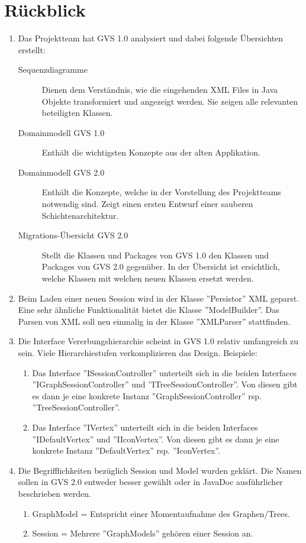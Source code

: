 \documentclass[11pt, a4paper,oneside]{scrartcl}
\begin{document}
\section{Rückblick}
\begin{enumerate}
	\item Das Projektteam hat GVS 1.0 analysiert und dabei folgende Übersichten erstellt:
	\begin{description}
		\item[Sequenzdiagramme] Dienen dem Verständnis, wie die eingehenden XML Files in Java Objekte transformiert und angezeigt werden. Sie zeigen alle relevanten beteiligten Klassen.
		\item[Domainmodell GVS 1.0 ] Enthält die wichtigsten Konzepte aus der alten Applikation.
		\item[Domainmodell GVS 2.0 ] Enthält die Konzepte, welche in der Vorstellung des Projektteams notwendig sind. Zeigt einen ersten Entwurf einer sauberen Schichtenarchitektur.
		\item[Migrations-Übersicht GVS 2.0 ] Stellt die Klassen und Packages von GVS 1.0 den Klassen und Packages von GVS 2.0 gegenüber. In der Übersicht ist ersichtlich, welche Klassen mit welchen neuen Klassen ersetzt werden.
	\end{description}
	\item Beim Laden einer neuen Session wird in der Klasse ''Persistor'' XML geparst. Eine sehr ähnliche Funktionalität bietet die Klasse ''ModelBuilder''. Das Parsen von XML soll neu einmalig in der Klasse ''XMLParser'' stattfinden. 
	\item Die Interface Vererbungshierarchie scheint in GVS 1.0 relativ umfangreich zu sein. Viele Hierarchiestufen verkomplizieren das Design. Beispiele: 
	\begin{enumerate}
		\item Das Interface ''ISessionController'' unterteilt sich in die beiden Interfaces ''IGraphSessionController'' und ''ITreeSessionController''. Von diesen gibt es dann je eine konkrete Instanz ''GraphSessionController'' rsp. ''TreeSessionController''.
		\item Das Interface ''IVertex'' unterteilt sich in die beiden Interfaces ''IDefaultVertex'' und ''IIconVertex''. Von diesen gibt es dann je eine konkrete Instanz ''DefaultVertex'' rsp. ''IconVertex''.
	\end{enumerate}
	\item Die Begrifflichkeiten bezüglich Session und Model wurden geklärt. Die Namen sollen in GVS 2.0 entweder besser gewählt oder in JavaDoc ausführlicher beschrieben werden.
	\begin{enumerate}
		\item GraphModel = Entspricht einer Momentaufnahme des Graphen/Trees.
		\item Session = Mehrere ''GraphModels'' gehören einer Session an.
	\end{enumerate}
\end{enumerate}
\end{document}
